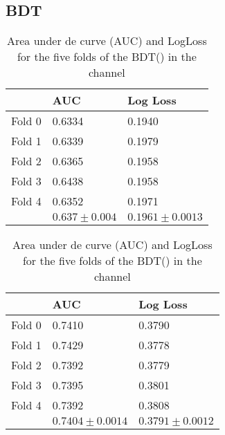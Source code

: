 \subsection{BDT}
\label{sec:ChaptH:EventSelection:BDT}
\begin{table}[]
\centering
\begin{tabular}{l|l|l}
\toprule
           & AUC                & Log Loss            \\ \midrule
Fold 0 & 0.6334 & 0.1940 \\
Fold 1 & 0.6339 & 0.1979 \\
Fold 2 & 0.6365 & 0.1958 \\
Fold 3 & 0.6438 & 0.1958 \\
Fold 4 & 0.6352 & 0.1971 \\ \midrule
	   & $0.637 \pm 0.004$    & $0.1961 \pm 0.0013$  \\ \bottomrule
\end{tabular}
\caption{Area under de curve (AUC) and LogLoss for the five folds of the BDT(\tHq) in the \dilepOStau channel}
\end{table}

\begin{table}[]
\centering
\begin{tabular}{l|l|l}
\toprule
           & AUC                & Log Loss            \\ \midrule
 Fold 0 & 0.7410         & 0.3790   \\
Fold 1 & 0.7429         & 0.3778  \\
Fold 2 & 0.7392         & 0.3779    \\
Fold 3 & 0.7395         & 0.3801  \\
Fold 4 & 0.7392         & 0.3808   \\ \midrule
	   & $0.7404 \pm 0.0014$ & $0.3791\pm 0.0012$  \\ \bottomrule
\end{tabular}
\caption{Area under de curve (AUC) and LogLoss for the five folds of the BDT(\ttbar) in the \dilepOStau channel}
\end{table} %


